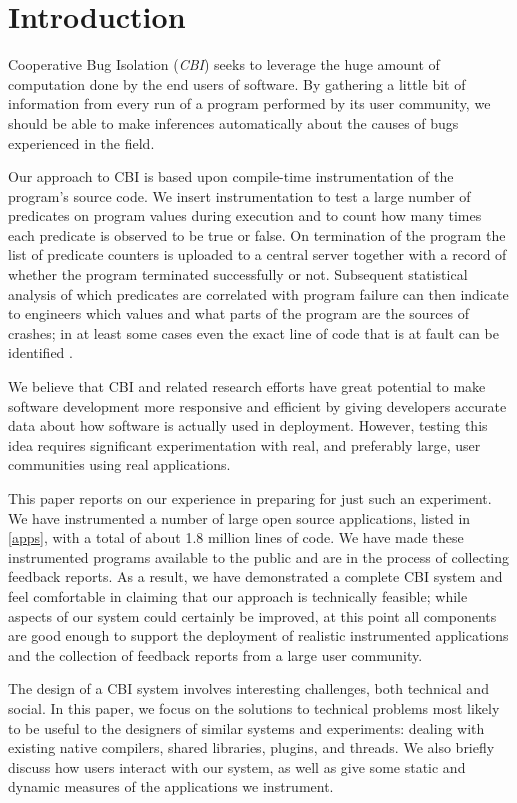 \documentclass[10pt,twocolumn]{article}
\newcommand{\termdef}[1]{\emph{#1}}
\begin{document}
\section{Introduction}

Cooperative Bug Isolation (\termdef{CBI}) seeks to leverage the huge
amount of computation done by the end users of software.  By gathering
a little bit of information from every run of a program performed by
its user community, we should be able to make inferences automatically
about the causes of bugs experienced in the field.

Our approach to CBI is based upon compile-time instrumentation of the
program's source code.  We insert instrumentation to
test a large number of predicates on program values during
execution and to count how many times each predicate is observed to be
true or false.  On termination of the program the list of predicate
counters is uploaded to a central server together with a record of
whether the program terminated successfully or not.  Subsequent
statistical analysis of which predicates are correlated with program
failure can then indicate to engineers which values and what parts of
the program are the sources of crashes; in at least some cases even
the exact line of code that is at fault can be identified
\cite{PLDI`03*141,Liblit:2003:SUEBI,Zheng:2003:SDSP}.

We believe that CBI and related research efforts have great potential
to make software development more responsive and efficient by giving
developers accurate data about how software is actually used in
deployment.  However, testing this idea requires significant
experimentation with real, and preferably large, user communities
using real applications.

This paper reports on our experience in preparing for just such an
experiment.  We have instrumented a number of large open source
applications, listed in \autoref{apps}, with a total of about 1.8
million lines of code. We have made these instrumented programs
available to the public and are in the process of collecting feedback
reports.  As a result, we have demonstrated a complete CBI system and
feel comfortable in claiming that our approach is technically
feasible; while aspects of our system could certainly be improved, at
this point all components are good enough to support the deployment of
realistic instrumented applications and the collection of feedback
reports from a large user community.

The design of a CBI system involves interesting challenges, both
technical and social.  In this paper, we focus on the solutions to
technical problems most likely to be useful to the designers of
similar systems and experiments: dealing with existing native
compilers, shared libraries, plugins, and threads.  We also briefly
discuss how users interact with our system, as well as give some
static and dynamic measures of the applications we instrument.
\end{document}
